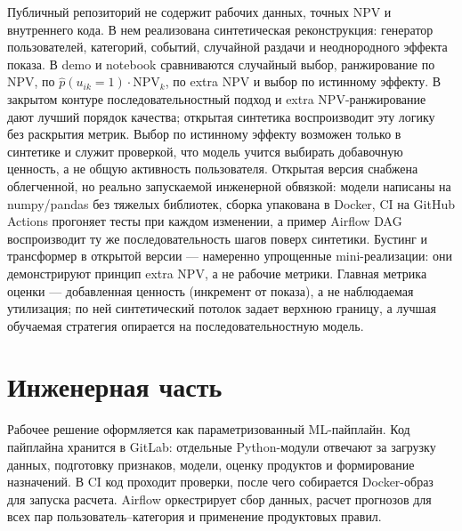 \documentclass[11pt,a4paper]{article}
\newcommand{\NPV}{\mathrm{NPV}}
\begin{document}
Публичный репозиторий не содержит рабочих данных, точных NPV и внутреннего кода. В нем реализована синтетическая реконструкция: генератор пользователей, категорий, событий, случайной раздачи и неоднородного эффекта показа. В demo и notebook сравниваются случайный выбор, ранжирование по NPV, по $\hat p(u_{ik}=1)\cdot \NPV_k$, по extra NPV и выбор по истинному эффекту. В закрытом контуре последовательностный подход и extra NPV-ранжирование дают лучший порядок качества; открытая синтетика воспроизводит эту логику без раскрытия метрик. Выбор по истинному эффекту возможен только в синтетике и служит проверкой, что модель учится выбирать добавочную ценность, а не общую активность пользователя. Открытая версия снабжена облегченной, но реально запускаемой инженерной обвязкой: модели написаны на numpy/pandas без тяжелых библиотек, сборка упакована в Docker, CI на GitHub Actions прогоняет тесты при каждом изменении, а пример Airflow DAG воспроизводит ту же последовательность шагов поверх синтетики. Бустинг и трансформер в открытой версии — намеренно упрощенные mini-реализации: они демонстрируют принцип extra NPV, а не рабочие метрики. Главная метрика оценки — добавленная ценность (инкремент от показа), а не наблюдаемая утилизация; по ней синтетический потолок задает верхнюю границу, а лучшая обучаемая стратегия опирается на последовательностную модель.

\section{Инженерная часть}

Рабочее решение оформляется как параметризованный ML-пайплайн. Код пайплайна хранится в GitLab: отдельные Python-модули отвечают за загрузку данных, подготовку признаков, модели, оценку продуктов и формирование назначений. В CI код проходит проверки, после чего собирается Docker-образ для запуска расчета. Airflow оркестрирует сбор данных, расчет прогнозов для всех пар пользователь--категория и применение продуктовых правил.
\end{document}
